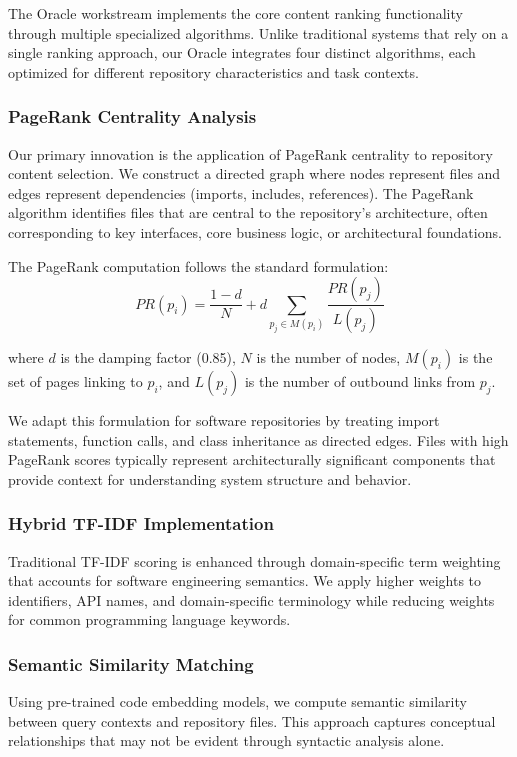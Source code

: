 \documentclass[conference]{IEEEtran}
\begin{document}
The Oracle workstream implements the core content ranking functionality through multiple specialized algorithms. Unlike traditional systems that rely on a single ranking approach, our Oracle integrates four distinct algorithms, each optimized for different repository characteristics and task contexts.

\subsubsection{PageRank Centrality Analysis}
Our primary innovation is the application of PageRank centrality to repository content selection. We construct a directed graph where nodes represent files and edges represent dependencies (imports, includes, references). The PageRank algorithm identifies files that are central to the repository's architecture, often corresponding to key interfaces, core business logic, or architectural foundations.

The PageRank computation follows the standard formulation:
\begin{equation}
PR(p_i) = \frac{1-d}{N} + d \sum_{p_j \in M(p_i)} \frac{PR(p_j)}{L(p_j)}
\end{equation}

where $d$ is the damping factor (0.85), $N$ is the number of nodes, $M(p_i)$ is the set of pages linking to $p_i$, and $L(p_j)$ is the number of outbound links from $p_j$.

We adapt this formulation for software repositories by treating import statements, function calls, and class inheritance as directed edges. Files with high PageRank scores typically represent architecturally significant components that provide context for understanding system structure and behavior.

\subsubsection{Hybrid TF-IDF Implementation}
Traditional TF-IDF scoring is enhanced through domain-specific term weighting that accounts for software engineering semantics. We apply higher weights to identifiers, API names, and domain-specific terminology while reducing weights for common programming language keywords.

\subsubsection{Semantic Similarity Matching}
Using pre-trained code embedding models, we compute semantic similarity between query contexts and repository files. This approach captures conceptual relationships that may not be evident through syntactic analysis alone.
\end{document}
